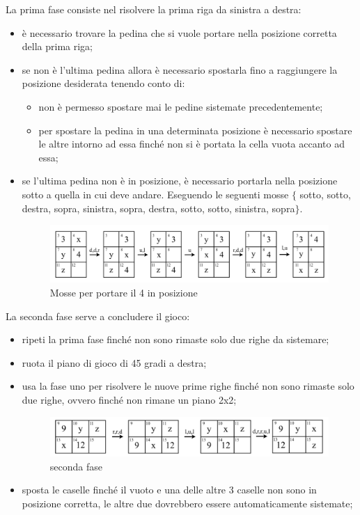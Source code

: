La prima fase consiste nel risolvere la prima riga da sinistra a destra:
\begin{itemize}
    \item è necessario trovare la pedina che si vuole portare nella posizione corretta della prima riga;
    \item se non è l'ultima pedina allora è necessario spostarla fino a raggiungere la posizione desiderata tenendo conto di:
    \begin{itemize}
        \item non è permesso spostare mai le pedine sistemate precedentemente;
        \item per spostare la pedina in una determinata posizione è necessario spostare le altre intorno ad essa finché non si è portata la cella vuota accanto ad essa; 
    \end{itemize}
    \item se l'ultima pedina non è in posizione, è necessario portarla nella posizione sotto a quella in cui deve andare. Eseguendo le seguenti mosse $\{$ sotto, sotto, destra, sopra, sinistra, sopra, destra, sotto, sotto, sinistra, sopra$\}$.
    \begin{figure}[h]
        \centering
        \includegraphics[width=0.8\linewidth]{movestoplace4.png}
        \caption{Mosse per portare il 4 in posizione}
        \label{fig:enter-label}
    \end{figure}
\end{itemize}
La seconda fase serve a concludere il gioco: 
\begin{itemize}
    \item ripeti la prima fase finché non sono rimaste solo due righe da sistemare; 
    \item ruota il piano di gioco di 45 gradi a destra;
    \item usa la fase uno per risolvere le nuove prime righe finché non sono rimaste solo due righe, ovvero finché non rimane un piano 2x2; 

    \begin{figure}[H]
        \centering
        \includegraphics[width=0.8\linewidth]{mosse45gradi.png}
        \caption{seconda fase}
        \label{fig:enter-label}
    \end{figure}
    \item sposta le caselle finché il vuoto e una delle altre 3 caselle non sono in posizione corretta, le altre due dovrebbero essere automaticamente sistemate;
\end{itemize}
